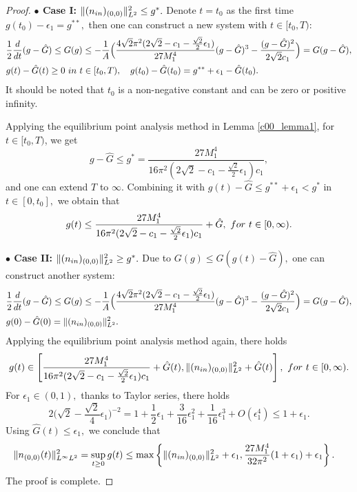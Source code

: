 \documentclass[12pt, reqno]{amsart}
\numberwithin{equation}{section}
\begin{document}
\begin{proof}
		{\bf $\bullet$ Case I: $\|(n_{\rm in})_{(0,0)}\|^2_{L^2}\leq g^*.$}
		Denote $t=t_0$ as the first time $g(t_0)-{\epsilon_1}=g^{**},$ then one can construct a new system  with $t\in[t_0,T)$:
		\begin{equation*}%
			\begin{aligned}
				&\frac{1}{2}\frac{d}{dt}(g-\hat{G})\leq G(g)\leq 
				-\frac{1}{A}\Big(\frac{4\sqrt{2}\pi^2(2\sqrt{2}-c_1-\frac{\sqrt{2}}{2}\epsilon_1)}
				{27M_1^4}(g-\hat{G})^3-\frac{(g-\hat{G})^2}{2\sqrt{2}c_1}\Big)
				=G(g-\hat{G}),\\
				&g(t)-\hat{G}(t)\geq0~{\rm in}~{t\in[t_0,T)},\quad g(t_0)-\hat{G}(t_0)=g^{**}+{\epsilon_1}-\hat{G}(t_0).
			\end{aligned}
		\end{equation*}
		It should be noted that $t_0$ is a non-negative constant and can be zero or positive infinity.
		
		Applying the equilibrium point analysis method in Lemma \ref{c00_lemma1}, 
		for $t\in[t_0,T)$, we get 
		$$g-\hat{G}\leq g^*=\frac{27M_1^4}{16\pi^2(2\sqrt{2}-c_1-\frac{\sqrt{2}}{2}\epsilon_1)c_1},$$
		and one can extend $T$ to $\infty.$
		Combining it with $g(t)-\hat{G}\leq g^{**}+{\epsilon_1}<g^{*}$ in $t\in[0,t_0],$ we obtain that 
		$$g(t)\leq \frac{27M_1^4}{16\pi^2(2\sqrt{2}-c_1-\frac{\sqrt{2}}{2}\epsilon_1)c_1}+\hat{G},
		~{\rm for}~t\in[0,\infty).$$
		
		{\bf $\bullet$ Case II:  $\|(n_{\rm in})_{(0,0)}\|^2_{L^2}\geq g^*.$} Due to $G(g)\leq G(g(t)-\hat{G}),$
		one can construct  another system:
		\begin{equation*}%
			\begin{aligned}
				&\frac{1}{2}\frac{d}{dt}(g-\hat{G})\leq G(g)\leq 
				-\frac{1}{A}\Big(\frac{4\sqrt{2}\pi^2(2\sqrt{2}-c_1-\frac{\sqrt{2}}{2}\epsilon_1)}
				{27M_1^4}(g-\hat{G})^3-\frac{(g-\hat{G})^2}{2\sqrt{2}c_1}\Big)
				=G(g-\hat{G}),\\
				&g(0)-\hat{G}(0)=\|(n_{\rm in})_{(0,0)}\|^2_{L^2}.
			\end{aligned}
		\end{equation*}
		Applying the equilibrium point analysis method again, there holds
		$$g(t)\in \left[\frac{27M_1^4}{16\pi^2(2\sqrt{2}-c_1-\frac{\sqrt{2}}{2}\epsilon_1)c_1}+\hat{G}(t),\|(n_{\rm in})_{(0,0)}\|^2_{L^2}+\hat{G}(t)\right] ,
		~{\rm for}~t\in[0,\infty).$$
		For $\epsilon_1\in(0,1),$ thanks to Taylor series, there holds
		$${2}{\Big(\sqrt{2}-\frac{\sqrt{2}}{4}\epsilon_1\Big)^{-2}}
		=1+\frac{1}{2}\epsilon_1+\frac{3}{16}\epsilon_1^2
		+\frac{1}{16}\epsilon_1^3+O(\epsilon_1^4)\leq 1+\epsilon_1.$$
		Using $\hat{G}(t)\leq {\epsilon_1},$ we conclude that
		\begin{align*}
			\|n_{(0,0)}(t)\|^2_{L^{\infty}L^2}
			=\sup_{t\geq0}g(t)
			&\leq \max\left\{\|(n_{\rm in})_{(0,0)}\|^2_{L^2}+{\epsilon_1},\frac{27M_1^4}{32\pi^2}(1+\epsilon_1)+{\epsilon_1}\right\}.
		\end{align*}
		The proof is complete.
	\end{proof}
	
\end{document}
